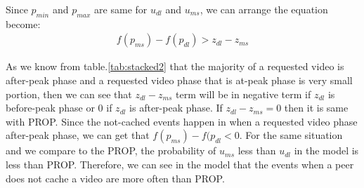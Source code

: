 \documentclass[10pt,final,journal,a4paper]{IEEEtran}
\begin{document}
Since $p_{min}$ and $p_{max}$ are same for $u_{dl}$ and $u_{ms}$, we can arrange the equation become:
\begin{align}\label{eq:dlms_4}
f(p_{ms}) - f(p_{dl}) > z_{dl} - z_{ms}
\end{align}


As we know from table.\ref{tab:stacked2} that the majority of a requested video is after-peak phase and a requested video phase that is  at-peak phase is very small portion, then we can see that $z_{dl} - z_{ms}$ term will be in negative term if $z_{dl}$ is  before-peak phase or $0$ if $z_{dl}$ is  after-peak phase. 
If $z_{dl} - z_{ms}=0$ then it is same with PROP. 
Since the not-cached events happen in when a requested video phase after-peak phase, we can get that $f(p_{ms}) - f(p_{dl} < 0$.
For the same situation and we compare to the PROP, the probability of $u_{ms}$ less than $u_{dl}$ in the model is less than PROP. 
Therefore, we can see in the model that the events when a peer does not cache a video are more often than PROP.





\end{document}
